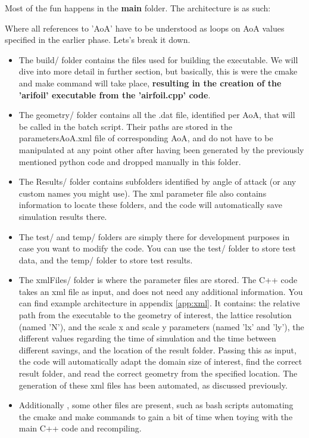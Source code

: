 \documentclass{article}
\begin{document}
Most of the fun happens in the \textbf{main} folder. The architecture is as such:

Where all references to 'AoA' have to be understood as loops on AoA values specified in the earlier phase. 
Lets's break it down.
\begin{itemize}
    \item The build/ folder contains the files used for building the executable. We will dive into more detail in further section, but basically, this is were the cmake and make command will take place, \textbf{resulting in the creation of the 'arifoil' executable from the 'airfoil.cpp' code}.
    \item The geometry/ folder contains all the .dat file, identified per AoA, that will be called in the batch script. Their paths are stored in the parameters\textunderscore AoA.xml file of corresponding AoA, and do not have to be manipulated at any point other after having been generated by the previously mentioned python code and dropped manually in this folder.
    \item The Results/ folder contains subfolders identified by angle of attack (or any custom names you might use). The xml parameter file also contains information to locate these folders, and the code will automatically save simulation results there.
    \item The test/ and temp/ folders are simply there for development purposes in case you want to modify the code. You can use the test/ folder to store test data, and the temp/ folder to store test results.
    \item The xmlFiles/ folder is where the parameter files are stored. The C++ code takes an xml file as input, and does not need any additional information. You can find example architecture in appendix \ref{app:xml}. It contains: the relative path from the executable to the geometry of interest, the lattice resolution (named 'N'), and the scale x and scale y parameters (named 'lx' and 'ly'), the different values regarding the time of simulation and the time between different savings, and the location of the result folder. Passing this as input, the code will automatically adapt the domain size of interest, find the correct result folder, and read the correct geometry from the specified location. The generation of these xml files has been automated, as discussed previously.
    \item Additionally , some other files are present, such as bash scripts automating the cmake and make commands to gain a bit of time when toying with the main C++ code and recompiling.
\end{itemize}
\end{document}
